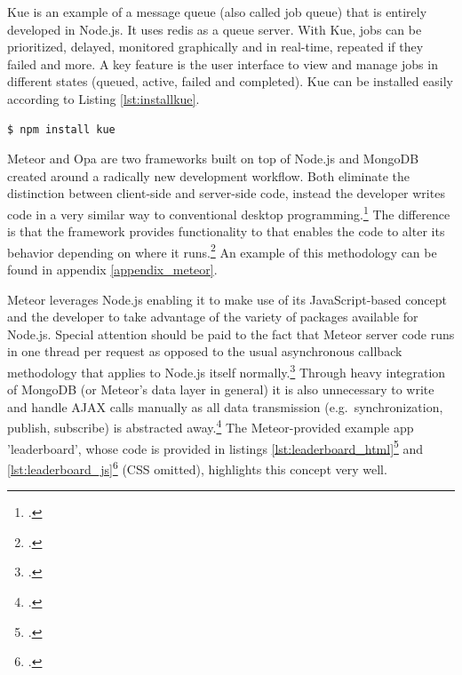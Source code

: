 \begin{appendices}
\begin{subappendices}
Kue is an example of a message queue (also called job queue) that is entirely developed in Node.js. It uses redis as a queue server. With Kue, jobs can be prioritized, delayed, monitored graphically and in real-time, repeated if they failed and more. A key feature is the user interface to view and manage jobs in different states (queued, active, failed and completed). Kue can be installed easily according to Listing \ref{lst:installkue}.

\begin{lstlisting}[language=javascript,
morekeywords={npm},
caption={Installing Kue via command-line},
label=lst:installkue]
$ npm install kue
\end{lstlisting}
\newpage

\label{appendix_meteor}
\FloatBarrier
Meteor and Opa are two frameworks built on top of Node.js and MongoDB created around a radically new development workflow. Both eliminate the distinction between client-side and server-side code, instead the developer writes code in a very similar way to conventional desktop programming.\footcite[Cf.][]{meteorDocs} The difference is that the framework provides functionality to that enables the code to alter its behavior depending on where it runs.\footcite[Cf.][]{meteorDocs} An example of this methodology can be found in appendix \ref{appendix_meteor}.

Meteor leverages Node.js enabling it to make use of its JavaScript-based concept and  the developer to take advantage of the variety of packages available for Node.js. Special attention should be paid to the fact that Meteor server code runs in one thread per request as opposed to the usual asynchronous callback methodology that applies to Node.js itself normally.\footcite[Cf.][]{meteorDocs} Through heavy integration of MongoDB (or Meteor's data layer in general) it is also unnecessary to write and handle AJAX calls manually as all data transmission (e.g.\ synchronization, publish, subscribe) is abstracted away.\footcite[Cf.][]{meteorDocs} The Meteor-provided example app 'leaderboard', whose code is provided in listings \ref{lst:leaderboard_html}\footcite[Cf.][]{leaderboard} and \ref{lst:leaderboard_js}\footcite[Cf.][]{leaderboard} (CSS omitted), highlights this concept very well.


\end{subappendices}
\end{appendices}
